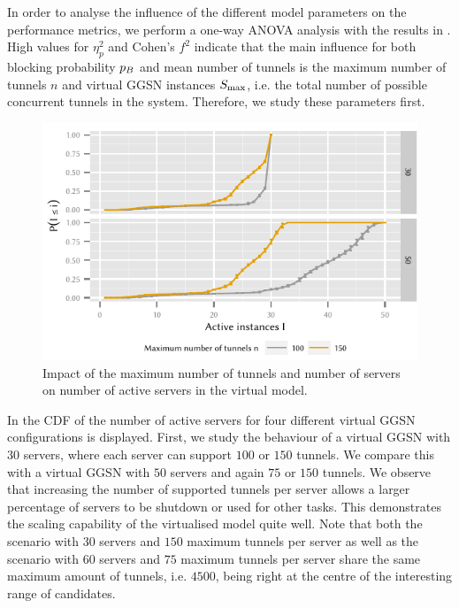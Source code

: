 In order to analyse the influence of the different model parameters on the performance metrics, we perform a one-way ANOVA analysis with the results in .
High values for \(\eta_p^2\) and Cohen's \(f^2\)\cite{Ellis2010} indicate that the main influence for both blocking probability \(p_B\) and mean number of tunnels is the maximum number of tunnels \(n\) and virtual \gls{GGSN} instances \(S_{\max}\), i.e. the total number of possible concurrent tunnels in the system.
Therefore, we study these parameters first.

\begin{figure}
  \centering
  \includegraphics{cloud/virtualized_network_functions/performance_evaluation/figures/instanceuse_multiserver}
  \caption{Impact of the maximum number of tunnels and number of servers on number of active servers in the virtual  model.}
  \label{fig:cloud:virtualized_network_functions:performance_evaluation:virtual_ggsn:instanceuse_multiserver}
\end{figure}

In  the \gls{CDF} of the number of active servers for four different virtual \gls{GGSN} configurations is displayed.
First, we study the behaviour of a virtual \gls{GGSN} with \(30\) servers, where each server can support \(100\) or \(150\) tunnels.  
We compare this with a virtual \gls{GGSN} with \(50\) servers and again \(75\) or \(150\) tunnels.
We observe that increasing the number of supported tunnels per server allows a larger percentage of servers to be shutdown or used for other tasks. This demonstrates the scaling capability of the virtualised model quite well.
Note that both the scenario with \(30\) servers and \(150\) maximum tunnels per server as well as the scenario with \(60\) servers and \(75\) maximum tunnels per server share the same maximum amount of tunnels, i.e. \(4500\), being right at the centre of the interesting range of candidates.

